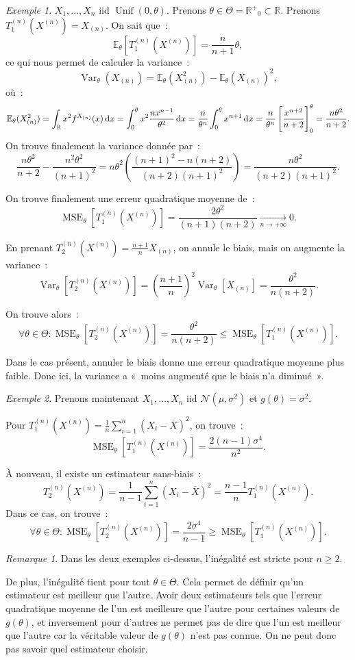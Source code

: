 \documentclass{report}
\DeclareMathOperator{\Unif}{Unif}  %
\DeclareMathOperator{\Var}{Var}
\DeclareMathOperator{\MSE}{MSE}
\newcommand{\E}{\mathbb E}
\newcommand{\pinfty}{{+\infty}}
\newcommand{\Nms}{\mathcal N(\mu, \sigma^2)}
\newcommand{\R}{\mathbb R}
\newcommand{\Rp}{{\mathbb R^+}}
\newcommand{\Xn}{{X^{(n)}}}
\theoremstyle{definition}
\theoremstyle{remark}
\newtheorem*{rmq}{Remarque}
\newtheorem{ex}{Exemple}[chapter]
\begin{document}
			\begin{ex} $X_1, \ldots, X_n$ iid $\Unif(0, \theta)$. Prenons $\theta \in \Theta = \Rp_0 \subset \R$. Prenons $T_1^{(n)}(\Xn) = X_{(n)}$. On sait que~:
			\[\E_\theta[T_1^{(n)}(\Xn)] = \frac n{n+1}\theta,\]
			ce qui nous permet de calculer la variance~:
			\[\Var_\theta(X_{(n)}) = \E_\theta(X_{(n)}^2) - \E_\theta(X_{(n)})^2,\]
			où~:
			\[\E_\theta(X_{(n)}^2) = \int_\R x^2f^{X_{(n)}}(x)\dif x = \int_0^\theta x^2\frac {nx^{n-1}}{\theta^2}\dif x = \frac n{\theta^n}\int_0^\theta x^{n+1}\dif x
				= \frac n{\theta^n}\left[\frac {x^{n+2}}{n+2}\right]_0^\theta = \frac {n\theta^2}{n+2}.\]
			On trouve finalement la variance donnée par~:
			\[\frac {n\theta^2}{n+2} - \frac {n^2\theta^2}{(n+1)^2} = n\theta^2\left(\frac {(n+1)^2 - n(n+2)}{(n+2)(n+1)^2}\right) = \frac {n\theta^2}{(n+2)(n+1)^2}.\]

			On trouve finalement une erreur quadratique moyenne de~:
			\[\MSE_\theta[T_1^{(n)}(\Xn)] = \frac {2\theta^2}{(n+1)(n+2)} \xrightarrow[n \to \pinfty]{} 0.\]

			En prenant $T_2^{(n)}(\Xn) = \frac {n+1}nX_{(n)}$, on annule le biais, mais on augmente la variance~:
			\[\Var_\theta[T_2^{(n)}(\Xn)] = \left(\frac {n+1}n\right)^2\Var_\theta[X_{(n)}] = \frac {\theta^2}{n(n+2)}.\]

			On trouve alors~:
			\[\forall \theta \in \Theta : \MSE_\theta[T_2^{(n)}(\Xn)] = \frac {\theta^2}{n(n+2)} \leq \MSE_\theta[T_1^{(n)}(\Xn)].\]

			Dans le cas présent, annuler le biais donne une erreur quadratique moyenne plus faible. Donc ici, la variance a «~moins augmenté que le biais n'a diminué~».
			\end{ex}

			\begin{ex} Prenons maintenant $X_1, \ldots, X_n$ iid $\Nms$ et $g(\theta) = \sigma^2$.

			Pour $T_1^{(n)}(\Xn) = \frac 1n\sum_{i=1}^n(X_i - \overline X)^2$, on trouve~:
			\[\MSE_\theta[T_1^{(n)}(\Xn)] = \frac {2(n-1)\sigma^4}{n^2}.\]

			À nouveau, il existe un estimateur sans-biais~:
			\[T_2^{(n)}(\Xn) = \frac 1{n-1}\sum_{i=1}^n(X_i - \overline X)^2 = \frac {n-1}nT_1^{(n)}(\Xn).\]
			Dans ce cas, on trouve~:
			\[\forall \theta \in \Theta : \MSE_\theta[T_2^{(n)}(\Xn)] = \frac {2\sigma^4}{n-1} \geq \MSE_\theta[T_1^{(n)}(\Xn)].\]
			\end{ex}

			\begin{rmq} Dans les deux exemples ci-dessus, l'inégalité est stricte pour $n \geq 2$.

			De plus, l'inégalité tient pour tout $\theta \in \Theta$. Cela permet de définir qu'un estimateur est meilleur que l'autre. Avoir deux estimateurs tels
			que l'erreur quadratique moyenne de l'un est meilleure que l'autre pour certaines valeurs de $g(\theta)$, et inversement pour d'autres ne permet pas de dire
			que l'un est meilleur que l'autre car la véritable valeur de $g(\theta)$ n'est pas connue. On ne peut donc pas savoir quel estimateur choisir.
			\end{rmq}
\end{document}
